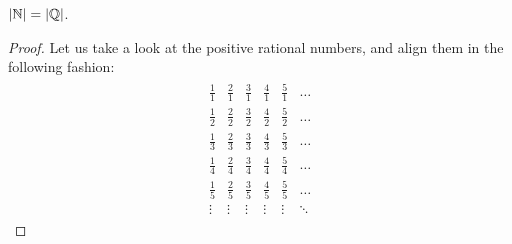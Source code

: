 \documentclass[../../textbook.tex]{subfiles}
\begin{document}
\begin{theorem}
$\left|\mathbb{N}\right|=\left|\mathbb{Q}\right|$.
\end{theorem}
\begin{proof}
Let us take a look at the positive rational numbers, and align them in the following fashion:
\begin{align*}
    \begin{matrix}
    \frac{1}{1} & \frac{2}{1} & \frac{3}{1} & \frac{4}{1} & \frac{5}{1} & \dots \\[0.5em]
    \frac{1}{2} & \frac{2}{2} & \frac{3}{2} & \frac{4}{2} & \frac{5}{2} & \dots \\[0.5em]
    \frac{1}{3} & \frac{2}{3} & \frac{3}{3} & \frac{4}{3} & \frac{5}{3} & \dots \\[0.5em]
    \frac{1}{4} & \frac{2}{4} & \frac{3}{4} & \frac{4}{4} & \frac{5}{4} & \dots \\[0.5em]
    \frac{1}{5} & \frac{2}{5} & \frac{3}{5} & \frac{4}{5} & \frac{5}{5} & \dots \\[0.5em]
    \vdots      & \vdots      & \vdots      & \vdots      & \vdots      & \ddots
    \end{matrix}
\end{align*}


\end{proof}
\end{document}
